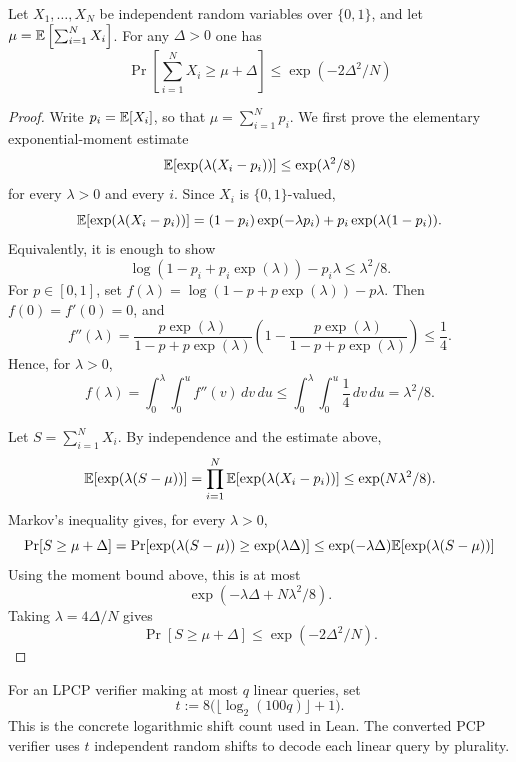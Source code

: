 \begin{lemma}
\label{LPCPToPCP.chernoff_bound}
\leanok
  Let $X_1,\dots, X_N$ be independent random variables over $\{0,1\}$, and let $\mu=\mathbb{E}\left[\sum_{i = 1}^N X_i\right]$. For any $\Delta > 0$ one has
  \begin{equation*}
    \Pr\left[\sum_{i = 1}^N X_i \ge \mu+\Delta\right] \le \exp(-2\Delta^2/N)
  \end{equation*}
\end{lemma}
\begin{proof}\leanok
  Write $p_i=\mathbb{E}[X_i]$, so that $\mu=\sum_{i=1}^N p_i$. We first prove the elementary exponential-moment estimate
  \[
    \mathbb{E}[\exp(\lambda(X_i-p_i))]\le \exp(\lambda^2/8)
  \]
  for every $\lambda>0$ and every $i$. Since $X_i$ is $\{0,1\}$-valued,
  \[
    \mathbb{E}[\exp(\lambda(X_i-p_i))]
    = (1-p_i)\exp(-\lambda p_i)+p_i\exp(\lambda(1-p_i)).
  \]
  Equivalently, it is enough to show
  \[
    \log(1-p_i+p_i\exp(\lambda))-p_i\lambda \le \lambda^2/8.
  \]
  For $p\in[0,1]$, set $f(\lambda)=\log(1-p+p\exp(\lambda))-p\lambda$. Then $f(0)=f'(0)=0$, and
  \[
    f''(\lambda)
    = \frac{p\exp(\lambda)}{1-p+p\exp(\lambda)}
      \left(1-\frac{p\exp(\lambda)}{1-p+p\exp(\lambda)}\right)
    \le \frac14.
  \]
  Hence, for $\lambda>0$,
  \[
    f(\lambda)
    = \int_0^\lambda\int_0^u f''(v)\,dv\,du
    \le \int_0^\lambda\int_0^u \frac14\,dv\,du
    = \lambda^2/8.
  \]

  Let $S=\sum_{i=1}^N X_i$. By independence and the estimate above,
  \[
    \mathbb{E}[\exp(\lambda(S-\mu))]
    = \prod_{i=1}^N \mathbb{E}[\exp(\lambda(X_i-p_i))]
    \le \exp(N\lambda^2/8).
  \]
  Markov's inequality gives, for every $\lambda>0$,
  \[
    \Pr[S\ge \mu+\Delta]
    = \Pr[\exp(\lambda(S-\mu))\ge \exp(\lambda\Delta)]
    \le \exp(-\lambda\Delta)\mathbb{E}[\exp(\lambda(S-\mu))]
  \]
  Using the moment bound above, this is at most
  \[
    \exp(-\lambda\Delta+N\lambda^2/8).
  \]
  Taking $\lambda=4\Delta/N$ gives
  \[
    \Pr[S\ge \mu+\Delta]\le \exp(-2\Delta^2/N).
  \]
\end{proof}

\begin{definition}
\label{LPCPToPCP.numShifts}
\leanok
For an LPCP verifier making at most \(q\) linear queries, set
\[
  t := 8\bigl(\lfloor \log_2(100q)\rfloor+1\bigr).
\]
This is the concrete logarithmic shift count used in Lean. The converted PCP
verifier uses \(t\) independent random shifts to decode each linear query by
plurality.
\end{definition}

